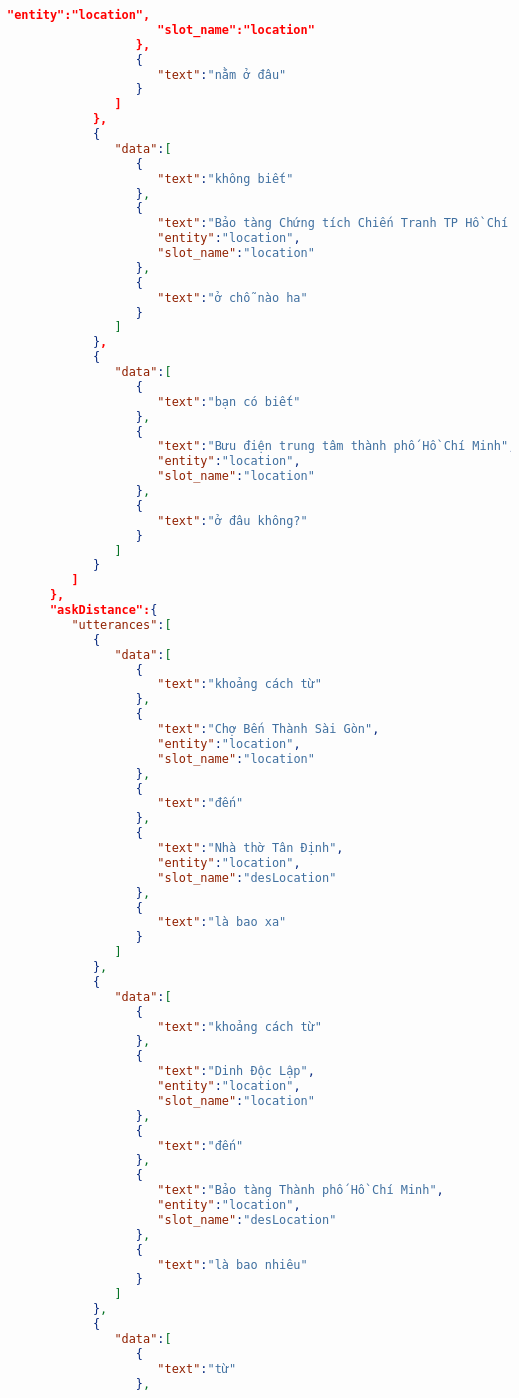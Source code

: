 \begin{lstlisting}[language=json,firstnumber=1]
                     "entity":"location",
                     "slot_name":"location"
                  },
                  {
                     "text":"nằm ở đâu"
                  }
               ]
            },
            {
               "data":[
                  {
                     "text":"không biết"
                  },
                  {
                     "text":"Bảo tàng Chứng tích Chiến Tranh TP Hồ Chí Minh",
                     "entity":"location",
                     "slot_name":"location"
                  },
                  {
                     "text":"ở chỗ nào ha"
                  }
               ]
            },
            {
               "data":[
                  {
                     "text":"bạn có biết"
                  },
                  {
                     "text":"Bưu điện trung tâm thành phố Hồ Chí Minh",
                     "entity":"location",
                     "slot_name":"location"
                  },
                  {
                     "text":"ở đâu không?"
                  }
               ]
            }
         ]
      },
      "askDistance":{
         "utterances":[
            {
               "data":[
                  {
                     "text":"khoảng cách từ"
                  },
                  {
                     "text":"Chợ Bến Thành Sài Gòn",
                     "entity":"location",
                     "slot_name":"location"
                  },
                  {
                     "text":"đến"
                  },
                  {
                     "text":"Nhà thờ Tân Định",
                     "entity":"location",
                     "slot_name":"desLocation"
                  },
                  {
                     "text":"là bao xa"
                  }
               ]
            },
            {
               "data":[
                  {
                     "text":"khoảng cách từ"
                  },
                  {
                     "text":"Dinh Độc Lập",
                     "entity":"location",
                     "slot_name":"location"
                  },
                  {
                     "text":"đến"
                  },
                  {
                     "text":"Bảo tàng Thành phố Hồ Chí Minh",
                     "entity":"location",
                     "slot_name":"desLocation"
                  },
                  {
                     "text":"là bao nhiêu"
                  }
               ]
            },
            {
               "data":[
                  {
                     "text":"từ"
                  },

\end{lstlisting}
